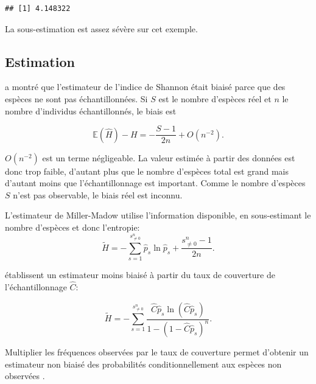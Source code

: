 \documentclass[
  11pt,
  french,
  a4paper,
  extrafontsizes,onecolumn,openright
  ]{memoir}
\begin{document}
\begin{verbatim}
## [1] 4.148322
\end{verbatim}

\normalsize

La sous-estimation est assez sévère sur cet exemple.

\hypertarget{sec:BiaisShannon}{%
\subsection{Estimation}\label{sec:BiaisShannon}}

\textcite{Basharin1959} a montré que l'estimateur de l'indice de Shannon était biaisé parce que des espèces ne sont pas échantillonnées.
Si \(S\) est le nombre d'espèces réel et \(n\) le nombre d'individus échantillonnés, le biais est

\begin{equation}
  \label{eq:Basharin1959}
  \mathbb{E}\left(\hat{H}\right)-H =-\frac{S-1}{2n} + O\left(n^{-2}\right).
\end{equation}

\(O\left(n^{-2}\right)\) est un terme négligeable.
La valeur estimée à partir des données est donc trop faible, d'autant plus que le nombre d'espèces total est grand mais d'autant moins que l'échantillonnage est important.
Comme le nombre d'espèces \(S\) n'est pas observable, le biais réel est inconnu.

L'estimateur de Miller-Madow \autocite{Miller1955} utilise l'information disponible, en sous-estimant le nombre d'espèces et donc l'entropie:
\begin{equation}
  \label{eq:MillerMadow}
  \tilde{H} = -\sum^{s^{n}_{\ne 0}}_{s=1}{\hat{p}_s \ln{\hat{p}_s}} + \frac{s^{n}_{\ne 0}-1}{2n}.
\end{equation}

\textcite{Chao2003} établissent un estimateur moins biaisé à partir du taux de couverture de l'échantillonnage \(\hat{C}\):

\begin{equation}
  \label{eq:ChaoShen}
  \tilde{H} = -\sum_{s=1}^{s^{n}_{\ne 0}}{\frac{\hat{C}{\hat{p}}_s \ln\left(\hat{C}{\hat{p}}_s\right)}{1-\left(1-\hat{C}{\hat{p}}_s\right)^n}}.
\end{equation}

Multiplier les fréquences observées par le taux de couverture permet d'obtenir un estimateur non biaisé des probabilités conditionnellement aux espèces non observées \autocite{Ashbridge2000}.
\end{document}
